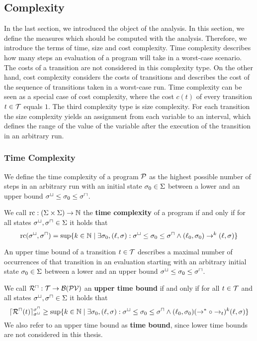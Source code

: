 \subsection{Complexity}

In the last section, we introduced the object of the analysis.
In this section, we define the measures which should be computed with the analysis.
Therefore, we introduce the terms of time, size and cost complexity.
Time complexity describes how many steps an evaluation of a program will take in a worst-case scenario.
The costs of a transition are not considered in this complexity type.
On the other hand, cost complexity considers the costs of transitions and describes the cost of the sequence of transitions taken in a worst-case run.
Time complexity can be seen as a special case of cost complexity, where the cost $c(t)$ of every transition $t \in \mathcal{T}$ equals $1$.
The third complexity type is size complexity.
For each transition the size complexity yields an assignment from each variable to an interval, which defines the range of the value of the variable after the execution of the transition in an arbitrary run.

\subsubsection{Time Complexity}

We define the time complexity of a program $\mathcal{P}$ as the highest possible number of steps in an arbitrary run with an initial state $\sigma_0 \in \Sigma$ between a lower and an upper bound ${\sigma^\sqcup} \leq \sigma_0 \leq {\sigma^\sqcap}$.

\begin{definition}
  We call $\text{rc}: (\Sigma \times \Sigma) \rightarrow \mathbb{N}$ the \textbf{time complexity} of a program if and only if for all states ${\sigma^\sqcup}, {\sigma^\sqcap} \in \Sigma$ it holds that
  \[ \text{rc}({\sigma^\sqcup}, {\sigma^\sqcap}) = \sup \lbrace  k \in \mathbb{N} \mid \exists \sigma_0, (\ell, \sigma): {\sigma^\sqcup} \leq \sigma_0 \leq {\sigma^\sqcap} \wedge (\ell_0, \sigma_0) \rightarrow^k (\ell, \sigma)  \rbrace \]
\end{definition}

An upper time bound of a transition $t \in \mathcal{T}$ describes a maximal number of occurrences of that transition in an evaluation starting with an arbitrary initial state $\sigma_0 \in \Sigma$ between a lower and an upper bound ${\sigma^\sqcup} \leq \sigma_0 \leq {\sigma^\sqcap}$.

\begin{definition}
  We call ${\mathcal{R}^\sqcap}: \mathcal{T} \rightarrow \mathcal{B}(\mathcal{PV})$ an \textbf{upper time bound} if and only if for all $t \in \mathcal{T}$ and all states ${\sigma^\sqcup}, {\sigma^\sqcap} \in \Sigma$ it holds that
  \[ \lceil {\mathcal{R}^\sqcap}(t) \rceil^{{\sigma^\sqcap}}_{{\sigma^\sqcup}} \geq \sup \lbrace  k \in \mathbb{N} \mid \exists \sigma_0, (\ell, \sigma): {\sigma^\sqcup} \leq \sigma_0 \leq {\sigma^\sqcap} \wedge (\ell_0, \sigma_0) (\rightarrow^* \circ \rightarrow_t)^k (\ell, \sigma)  \rbrace \]
  We also refer to an upper time bound as \textbf{time bound}, since lower time bounds are not considered in this thesis.
\end{definition}

